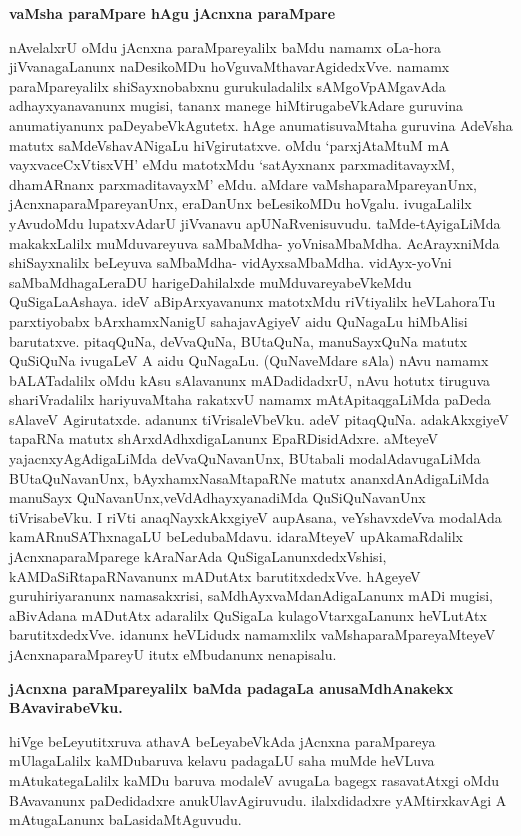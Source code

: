 {\bigskip
\noindent
{\large\bf vaMsha paraMpare hAgu jAcnxna paraMpare}}\label{page139}
\medskip

\noindent
nAvelalxrU oMdu jAcnxna paraMpareyalilx baMdu namamx oLa-hora jiVvanagaLanunx naDesikoMDu hoVguvaMthavarAgidedxVve. namamx paraMpareyalilx shiSayx\-nobabxnu guru\-kuladalilx sAMgoVpAMgavAda adhayx\-yanavanunx mugisi, tananx manege hiMtiruga\-beVkAdare guruvina anumatiyanunx paDeyabeVkAgutetx. hAge anumatisu\-vaMtaha guruvina AdeVsha matutx saMdeVshavANigaLu hiVgirutatxve. oMdu `parxjAtaMtuM mA\- vayxvaceCxVtisxVH'\label{139} eMdu matotxMdu `satAyxnanx parxmaditavayxM, dhamARnanx parxmaditavayxM' eMdu. aMdare vaMsha\-paraMpareyanUnx, jAcnxnaparaMpareyanUnx, eraDanUnx beLesi\-koMDu hoVgalu. ivu\-gaLalilx yAvudoM\-du lupatxvAdarU jiVvanavu apUNaRvenisuvudu. taMde-tAyigaLiMda makakxLalilx muMdu\-vare\-yuva saMbaMdha- yoVni\-saMbaMdha. AcArayxniMda shiSayxnalilx beLeyuva saMbaMdha- vidAyxsaMbaMdha. vidAyx-\break\-yoVni saMbaMdhagaLeraDU harigeDahilalxde muMduvareyabeVkeMdu QuSigaLa\break Ashaya. ideV aBi\-pArxya\-vanunx matotxMdu riVtiyalilx heVLahoraTu parxti\-yobabx bArxhamxNanigU sahajavAgiyeV aidu QuNagaLu hiMbAlisi barutatxve. pitaqQuNa, deVvaQuNa, BUtaQuNa, manuSayxQuNa matutx QuSiQuNa ivugaLeV A aidu QuNa\-gaLu. (QuNaveMdare sAla) nAvu namamx bALATadalilx oMdu kAsu sAlavanunx mADa\-didadxrU, nAvu hotutx tiruguva shariVradalilx hariyuvaMtaha rakatxvU \hbox{namamx} mAtApitaqgaLiMda paDeda sAlaveV Agirutatxde. adanunx tiVrisaleVbeVku. adeV pitaqQuNa. adakAkxgiyeV tapaRNa matutx shArxdAdhxdi\-gaLanunx EpaRDisidAdxre. aMteyeV yajacnxyAgAdigaLiMda deVvaQuNavanUnx, BUtabali modalAdavu\-gaLiMda BUta\-QuNavanUnx, bAyxhamxNasaMtapaRNe matutx ananxdAnAdigaLiMda manuSayx QuNavanUnx,\break veVdA\-dhayxyanadiMda QuSiQuNavanUnx tiVrisabeVku. I riVti anaqNayxkAkxgiyeV aupA\-sana, veYshavxdeVva moda\-lAda kamARnuSAThxnagaLU beLedubaMdavu. idaraMteyeV upAkamaRdalilx jAcnxnaparaMparege kAraNa\-rAda QuSigaLanunxdedxVshisi, kAMDaSiR\break\-tapaRNavanunx mADutAtx barutitxdedxVve. hAgeyeV guruhiriyaranunx namasakxrisi, saMdhAyx\-vaMdanAdigaLanunx mADi mugisi, aBivAdana mADutAtx adaralilx QuSi\-gaLa kulagoVtarx\-gaLanunx heVLutAtx barutitxdedxVve. idanunx heVLidudx namamxlilx vaMshaparaM\-pareyaMteyeV jAcnxnaparaMpareyU itutx eMbudanunx nenapisalu.

{\bigskip
\noindent
{\large\bf jAcnxna paraMpareyalilx baMda padagaLa anusaMdhAnakekx BAvavirabeVku.}}\label{page140}
\medskip

\noindent
hiVge beLeyutitxruva athavA beLeyabeVkAda jAcnxna paraMpareya mUlagaLalilx kaMDubaruva kelavu padagaLU saha muMde heVLuva mAtukategaLalilx kaMDu baruva modaleV avugaLa bagegx rasavatAtxgi oMdu BAvavanunx paDedidadxre anukUlavAgiruvudu. ilalxdidadxre yAMtirxkavAgi A mAtugaLanunx baLasi\-daMtA\-gu\-vudu.

